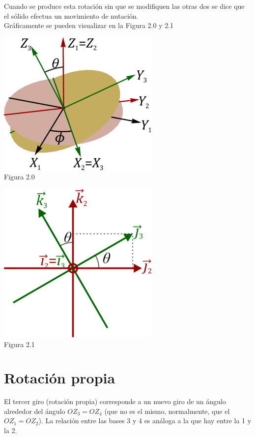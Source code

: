 \documentclass[11pt,a4paper,oldfontcommands,oneside]{memoir}
\begin{document}
Cuando se produce esta rotación sin que se modifiquen las otras dos se dice que el sólido efectua un movimiento de nutación.\\

Gráficamente se pueden visualizar en la Figura 2.0 y 2.1

\begin{center}
\includegraphics[scale=3.1]{3D.png} 
\\
Figura 2.0
\end{center}

\begin{center}
\includegraphics[scale=3.0]{plano.png} 
\\
Figura 2.1
\end{center}

\section{Rotación propia}
El tercer giro (rotación propia) corresponde a un nuevo giro de un ángulo alrededor del ángulo $OZ_3 = OZ_4$ (que no es el mismo, normalmente, que el $OZ_1 = OZ_2$). La relación entre las bases 3 y 4 es análoga a la que hay entre la 1 y la 2.
\end{document}
